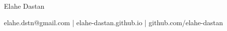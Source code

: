 \documentclass[11pt,letterpaper]{article}
\begin{document}
\centerline{\Huge Elahe Dastan}
\centerline{elahe.dstn@gmail.com | elahe-dastan.github.io | github.com/elahe-dastan}




\end{document}
